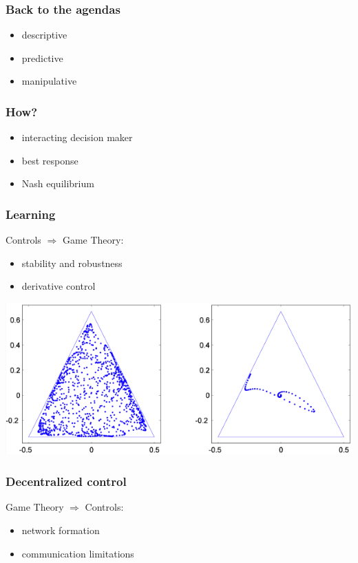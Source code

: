 \begin{frame}
  \frametitle{Back to the agendas}
  \begin{itemize}
  \pause \item descriptive
  \pause \item predictive
  \pause \item manipulative
  \end{itemize}
\end{frame}

{
  \begin{frame}

    \frametitle{\textbf{How?}}
    \begin{itemize}
    \pause \item interacting decision maker
    \pause \item best response
    \pause \item Nash equilibrium
    \end{itemize}
  \end{frame}
}


\begin{frame}
  \frametitle{Learning}
  Controls $\Rightarrow$ Game Theory:
  \begin{itemize}
  \pause \item stability and robustness
  \pause \item derivative control
  \end{itemize}
  \includegraphics[width=0.6\paperwidth]{images/derivative_control.png}
\end{frame}

\begin{frame}
  \frametitle{Decentralized control}
  Game Theory $\Rightarrow$ Controls:
  \begin{itemize}
  \pause \item network formation
  \pause \item communication limitations
  \end{itemize}
\end{frame}

